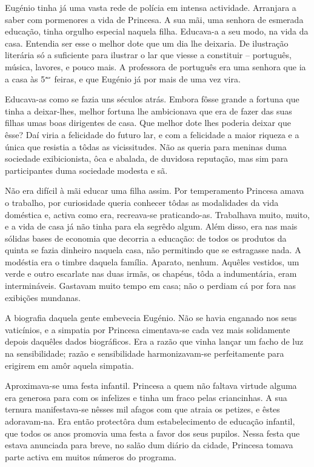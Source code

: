 \documentclass[9pt]{article}
\begin{document}
Eugé\-nio tinha já uma vasta rede de polícia em intensa actividade.
Arranjara a saber com pormenores a vida de Princesa. A sua mãi, uma
senhora de esmerada educa\-ção, tinha orgu\-lho especial naquela fi\-lha.
Educava-a a seu modo, na vida da casa. Entendia ser esse o me\-lhor dote que
um dia lhe deixaria. De ilustra\-ção literária só a suficiente para ilustrar o lar que viesse a constituir -- por\-tu\-guês, música, lavores, e pouco
mais. A professora de por\-tu\-guês era uma senhora que ia a casa às 5$^{\mbox{\tiny as}}$ feiras, e que Eugé\-nio já por mais de uma vez vira.

Educava-as como se fazia uns séculos atrás. Embora fôsse gran\-de a
fortuna que tinha a deixar-\-lhes, me\-lhor fortuna lhe ambicionava que era
de fazer das suas fi\-lhas umas boas dirigentes de casa. Que me\-lhor
dote lhes poderia deixar que êsse? Daí viria a felicidade do futuro lar, e
com a felicidade a maior riqueza e a única que resistia a tôdas as
vicissitudes. Não as queria para meninas duma sociedade exibicionista, ôca e abalada, de duvidosa reputa\-ção, mas sim para participantes
duma sociedade modesta e sã.

Não era difícil à mãi educar uma fi\-lha assim. Por temperamento
Princesa amava o traba\-lho, por curiosidade queria conhecer tôdas as
modalidades da vida doméstica e, activa como era, recreava-se pra\-ti\-can\-do-as. Traba\-lhava muito, muito, e a vida de casa já não tinha para ela
segrêdo algum. Além disso, era nas mais sólidas bases de economia que decorria a
educa\-ção: de todos os produtos da quinta se fazia dinheiro naquela
casa, não permitindo que se estragasse nada. A modéstia era o timbre
daquela fa\-mí\-lia. Aparato, nenhum. Aquêles vestidos, um verde e outro
escarlate nas duas irmãs, os chapéus, tôda a indumentária, eram intermináveis. Gastavam muito tempo em casa; não o perdiam cá por fora nas
exibi\-ções mundanas.

A biografia daquela gente embevecia Eugé\-nio. Não se havia enganado nos seus vaticínios, e a simpatia por Princesa cimentava-se cada
vez mais solidamente depois da\-quê\-les dados biográficos. Era a razão
que vinha lan\-çar um facho de luz na sensibilidade; razão e sensibilidade harmonizavam-se perfeitamente para erigirem em amôr aquela simpatia.

Aproximava-se uma festa infantil. Princesa a quem não faltava
virtude alguma era generosa para com os infelizes e tinha um fraco
pelas criancinhas. A sua ternura manifestava-se nêsses mil afagos
com que atraia os petizes, e êstes adoravam-na. Era então protectôra
dum estabelecimento de educa\-ção infantil, que todos os anos promovia
uma festa a favor dos seus pupilos. Nessa festa que estava anunciada
para breve, no salão dum diário da cidade, Princesa tomava parte activa em muitos números do programa.
\end{document}
